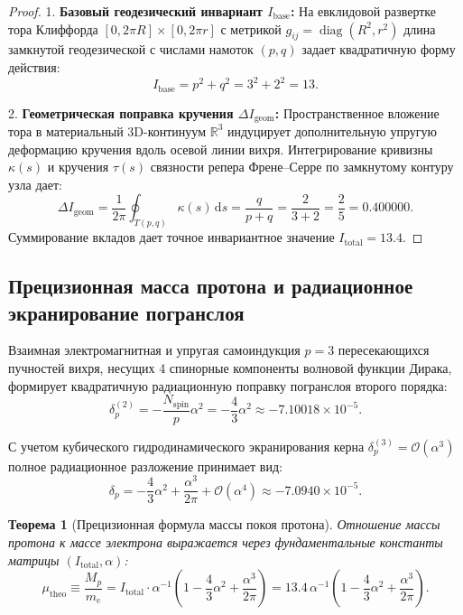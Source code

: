 \documentclass[12pt,a4paper]{article}
\newtheorem{theorem}{Теорема}[section]
\theoremstyle{definition}
\theoremstyle{remark}
\begin{document}
\begin{proof}
	1. \textbf{Базовый геодезический инвариант $I_{\mathrm{base}}$:} 
	На евклидовой развертке тора Клиффорда $[0, 2\pi R] \times [0, 2\pi r]$ с метрикой $g_{ij} = \operatorname{diag}(R^2, r^2)$ длина замкнутой геодезической с числами намоток $(p, q)$ задает квадратичную форму действия:
	\begin{equation}
		I_{\mathrm{base}} = p^2 + q^2 = 3^2 + 2^2 = 13.
		\label{eq:i_base_proof}
	\end{equation}
	
	2. \textbf{Геометрическая поправка кручения $\Delta I_{\mathrm{geom}}$:}
	Пространственное вложение тора в материальный 3D-континуум $\mathbb{R}^3$ индуцирует дополнительную упругую деформацию кручения вдоль осевой линии вихря. Интегрирование кривизны $\kappa(s)$ и кручения $\tau(s)$ связности репера Френе--Серре по замкнутому контуру узла дает:
	\begin{equation}
		\Delta I_{\mathrm{geom}} = \frac{1}{2\pi} \oint_{T(p,q)} \kappa(s) \, \mathrm{d}s = \frac{q}{p+q} = \frac{2}{3+2} = \frac{2}{5} = 0.400000.
		\label{eq:i_geom_proof}
	\end{equation}
	Суммирование вкладов дает точное инвариантное значение $I_{\mathrm{total}} = 13.4$.
\end{proof}

\subsection{Прецизионная масса протона и радиационное экранирование погранслоя}
Взаимная электромагнитная и упругая самоиндукция $p=3$ пересекающихся пучностей вихря, несущих 4 спинорные компоненты волновой функции Дирака, формирует квадратичную радиационную поправку погранслоя второго порядка:
\begin{equation}
	\delta_p^{(2)} = -\frac{N_{\mathrm{spin}}}{p} \alpha^2 = -\frac{4}{3}\alpha^2 \approx -7.10018 \times 10^{-5}.
	\label{eq:proton_rad_order2}
\end{equation}

С учетом кубического гидродинамического экранирования керна $\delta_p^{(3)} = \mathcal{O}(\alpha^3)$ полное радиационное разложение принимает вид:
\begin{equation}
	\delta_p = -\frac{4}{3}\alpha^2 + \frac{\alpha^3}{2\pi} + \mathcal{O}(\alpha^4) \approx -7.0940 \times 10^{-5}.
	\label{eq:proton_rad_full}
\end{equation}

\begin{theorem}[Прецизионная формула массы покоя протона]
	Отношение массы протона к массе электрона выражается через фундаментальные константы матрицы $(I_{\mathrm{total}}, \alpha)$:
	\begin{equation}
		\mu_{\mathrm{theo}} \equiv \frac{M_p}{m_e} = I_{\mathrm{total}} \cdot \alpha^{-1} \left( 1 - \frac{4}{3}\alpha^2 + \frac{\alpha^3}{2\pi} \right) = 13.4 \, \alpha^{-1} \left( 1 - \frac{4}{3}\alpha^2 + \frac{\alpha^3}{2\pi} \right).
		\label{eq:proton_mass_master}
	\end{equation}
\end{theorem}
\end{document}
